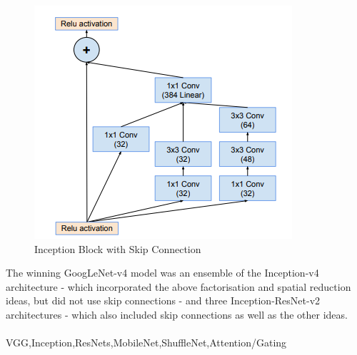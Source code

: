 \documentclass[11pt]{article} %
\theoremstyle{plain}
\theoremstyle{definition}
\begin{document}
\begin{itemize}
    \begin{figure}[!ht]
        \centering    
        \caption{Inception Block with Skip Connection}
        \label{fig:InceptionResNet}
        \includegraphics[scale=0.7]{InceptionResNet.PNG}
    \end{figure}
\end{itemize}
The winning GoogLeNet-v4 model was an ensemble of the Inception-v4 architecture - which incorporated the above factorisation and spatial reduction ideas, but did not use skip connections - and three Inception-ResNet-v2 architectures - which also included skip connections as well as the other ideas. 
\\
\\
\noindent
VGG,Inception,ResNets,MobileNet,ShuffleNet,Attention/Gating



\clearpage
\newpage
\end{document}

